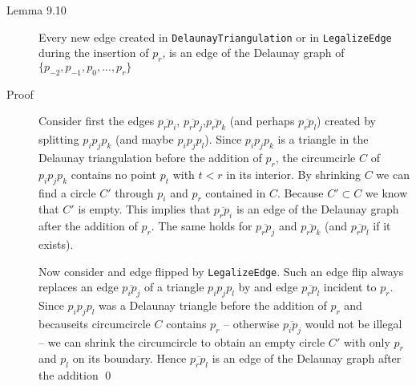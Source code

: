 

\begin{description}
\item[Lemma 9.10] Every new edge created in \texttt{DelaunayTriangulation} or in
  \texttt{LegalizeEdge} during the insertion of $p_r$, is an edge of the
  Delaunay graph of $\{p_{-2},p_{-1},p_0,...,p_r\}$

\item[Proof] Consider first the edges $\overline{p_rp_i}$,
  $\overline{p_rp_j}$,$\overline{p_rp_k}$ (and perhaps $\overline{p_rp_l}$)
  created by splitting $p_ip_jp_k$ (and maybe $p_ip_jp_l$).  Since $p_ip_jp_k$
  is a triangle in the Delaunay triangulation before the addition of $p_r$, the
  circumcirle $C$ of $p_ip_jp_k$ contains no point $p_t$ with $t<r$ in its
  interior.  By shrinking $C$ we can find a circle $C'$ through $p_i$ and $p_r$
  contained in $C$.  Because $C' \subset C$ we know that $C'$ is empty. This
  implies that $\overline{p_rp_i}$ is an edge of the Delaunay graph after the
  addition of $p_r$. The same holds for $\overline{p_rp_j}$ and
  $\overline{p_rp_k}$ (and $\overline{p_rp_l}$ if it exists).

Now consider and edge flipped by \texttt{LegalizeEdge}. Such an edge flip always
replaces an edge $\overline{p_ip_j}$ of a triangle $p_ip_jp_l$ by and edge
$\overline{p_rp_l}$ incident to $p_r$.  Since $p_ip_jp_l$ was a Delaunay
triangle before the addition of $p_r$ and becauseits circumcircle $C$ contains
$p_r$ -- otherwise $\overline{p_ip_j}$ would not be illegal -- we can shrink the
circumcircle to obtain an empty circle $C'$ with only $p_r$ and $p_l$ on its
boundary. Hence $\overline{p_rp_l}$ is an edge of the Delaunay graph after the
addition \qed


\end{description}

